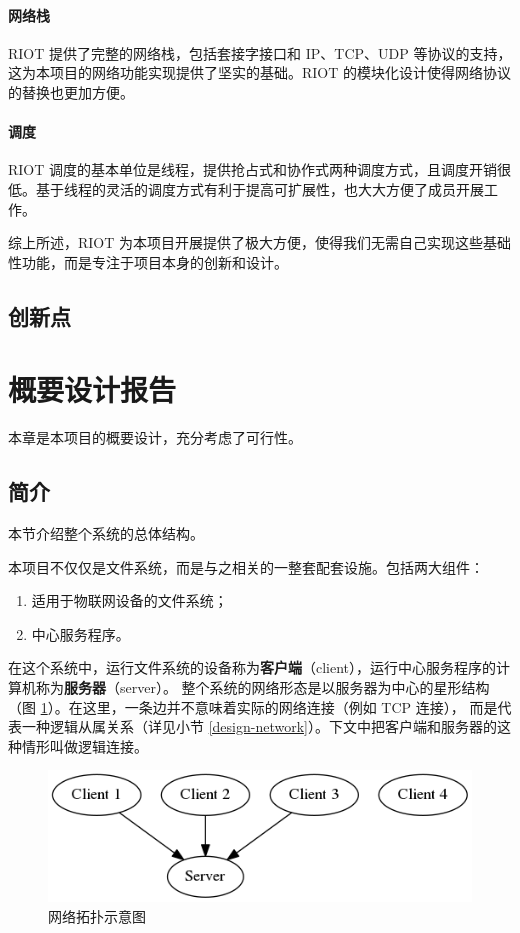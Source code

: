 \documentclass{ctexart}
\begin{document}
\paragraph{网络栈}
RIOT 提供了完整的网络栈，包括套接字接口和 IP、TCP、UDP 等协议的支持，这为本项目的网络功能实现提供了坚实的基础。RIOT 的模块化设计使得网络协议的替换也更加方便。

\paragraph{调度}
RIOT 调度的基本单位是线程，提供抢占式和协作式两种调度方式，且调度开销很低。基于线程的灵活的调度方式有利于提高可扩展性，也大大方便了成员开展工作。

综上所述，RIOT 为本项目开展提供了极大方便，使得我们无需自己实现这些基础性功能，而是专注于项目本身的创新和设计。

\subsection{创新点}

\section{概要设计报告}
本章是本项目的概要设计，充分考虑了可行性。

\subsection{简介}
本节介绍整个系统的总体结构。

本项目不仅仅是文件系统，而是与之相关的一整套配套设施。包括两大组件：
\begin{enumerate}
	\item 适用于物联网设备的文件系统；
	\item 中心服务程序。
\end{enumerate}
在这个系统中，运行文件系统的设备称为\textbf{客户端}（client），运行中心服务程序的计算机称为\textbf{服务器}（server）。
整个系统的网络形态是以服务器为中心的星形结构（图 \ref{design-net-topo}）。在这里，一条边并不意味着实际的网络连接（例如 TCP 连接），
而是代表一种逻辑从属关系（详见小节 \ref{design-network}）。下文中把客户端和服务器的这种情形叫做逻辑连接。

\begin{figure}
	\includegraphics[width=\textwidth]{design-net-topo.png}
	\caption{网络拓扑示意图}
	\label{design-net-topo}
\end{figure}
\end{document}
